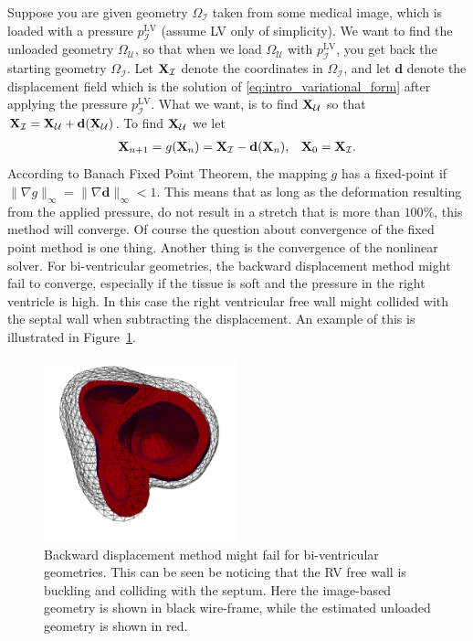 Suppose you are given geometry $\Omega_{\mathcal{I}}$ taken from some
medical image, which is loaded with a pressure $p_{\mathcal{I}}^{\mathrm{LV}}$ (assume LV only of
simplicity). We want to find the unloaded geometry 
$\Omega_{\mathcal{U}}$, so that when we load $\Omega_{\mathcal{U}}$ with $p_{\mathcal{I}}^{\mathrm{LV}}$,
you get back the starting geometry $\Omega_{\mathcal{I}}$. Let
$\mathbf{X}_{\mathcal{I}}$ denote the coordinates in $\Omega_{\mathcal{I}}$, and
let $\mathbf{d}$ denote the displacement field which is the solution
of \eqref{eq:intro_variational_form} after applying the pressure
$p_{\mathcal{I}}^{\mathrm{LV}}$. What we want, is to find
$\mathbf{X}_{\mathcal{U}}$ so that $\mathbf{X}_{\mathcal{I}} =
\mathbf{X}_{\mathcal{U}} + \mathbf{d}(\mathbf{X}_{\mathcal{U}})$. To find
$\mathbf{X}_{\mathcal{U}}$ we let 
\begin{align}
  \mathbf{X}_{n+1} = g(\mathbf{X}_n) =  \mathbf{X}_{\mathcal{I}} - \mathbf{d}(\mathbf{X}_n),
  && \mathbf{X}_0 = \mathbf{X}_{\mathcal{I}}.
\end{align}
According to Banach Fixed Point Theorem, the mapping $g$ has a
fixed-point if $\| \nabla g \|_{\infty} = \| \nabla \mathbf{d}
\|_{\infty} < 1$. This means that as long as the deformation
resulting from the applied pressure, do not result in a stretch that
is more than $100 \%$, this method will converge. Of course the
question about convergence of the fixed point method is one
thing. Another thing is the convergence of the nonlinear solver.
For bi-ventricular geometries, the backward displacement method might
fail to converge, especially if the tissue is soft and the pressure in
the right ventricle is high. In this case the
right ventricular free wall might collided with the septal wall when
subtracting the displacement. An example of this is illustrated in
Figure~\ref{fig:unloading_fail}.


\begin{figure}[htbp]
  \centering
    \includegraphics[width=0.5\textwidth]{chapters/introduction/figures/unloading_fail/unloading_fail.png}
\caption{Backward displacement method might fail for bi-ventricular
  geometries. This can be seen be noticing that the RV free wall is
  buckling and colliding with the septum. Here the image-based
  geometry is shown in black wire-frame, while the estimated unloaded
geometry is shown in red.}
\label{fig:unloading_fail}
\end{figure}

